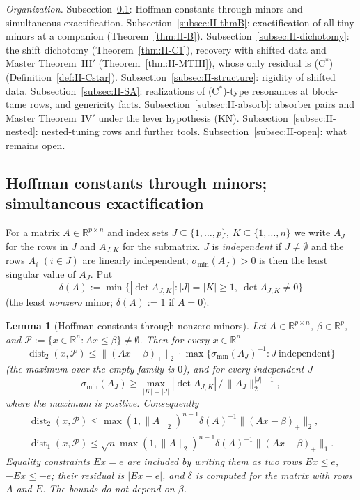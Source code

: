 \documentclass[10pt]{amsart}
\newtheorem{lemma}[theorem]{Lemma}
\theoremstyle{definition}
\theoremstyle{remark}
\newcommand{\dist}{\operatorname{dist}}
\newcommand{\R}{\mathbb R}
\begin{document}
\smallskip\noindent\emph{Organization.}
Subsection~\ref{subsec:II-hoffman}: Hoffman constants through minors and
simultaneous exactification.  Subsection~\ref{subsec:II-thmB}: exactification
of all tiny minors at a companion (Theorem~\ref{thm:II-B}).
Subsection~\ref{subsec:II-dichotomy}: the shift dichotomy
(Theorem~\ref{thm:II-C1}), recovery with shifted data and Master
Theorem~III$'$ (Theorem~\ref{thm:II-MTIII}), whose only residual is (C$^*$)
(Definition~\ref{def:II-Cstar}).  Subsection~\ref{subsec:II-structure}:
rigidity of shifted data.  Subsection~\ref{subsec:II-SA}: realizations of
(C$^*$)-type resonances at block-tame rows, and genericity facts.
Subsection~\ref{subsec:II-absorb}: absorber pairs and Master
Theorem~IV$'$ under the lever hypothesis (KN).
Subsection~\ref{subsec:II-nested}: nested-tuning rows and further tools.
Subsection~\ref{subsec:II-open}: what remains open.

\subsection{Hoffman constants through minors; simultaneous exactification}\label{subsec:II-hoffman}

For a matrix $A\in\R^{p\times n}$ and index sets $J\subseteq\{1,\dots,p\}$,
$K\subseteq\{1,\dots,n\}$ we write $A_J$ for the rows in $J$ and $A_{J,K}$
for the submatrix.  $J$ is \emph{independent} if $J\ne\emptyset$ and the
rows $A_i$ $(i\in J)$ are linearly independent; $\sigma_{\min}(A_J)>0$ is
then the least singular value of $A_J$.  Put
\[
 \delta(A):=\min\{|\det A_{J,K}|:|J|=|K|\ge1,\ \det A_{J,K}\ne0\}
\]
(the least \emph{nonzero} minor; $\delta(A):=1$ if $A=0$).

\begin{lemma}[Hoffman constants through nonzero minors]\label{lem:II-hoffman}
Let $A\in\R^{p\times n}$, $\beta\in\R^p$, and $\mathcal P:=\{x\in\R^n:Ax\le
\beta\}\ne\emptyset$.  Then for every $x\in\R^n$
\begin{equation}\label{eq:II-hoff1}
 \dist_2(x,\mathcal P)\le\|(Ax-\beta)_+\|_2\cdot\max\{\sigma_{\min}(A_J)^{-1}:
 J\ \text{independent}\}
\end{equation}
\textup{(}the maximum over the empty family is $0$\textup{)}, and for every
independent $J$
\begin{equation}\label{eq:II-hoff2}
 \sigma_{\min}(A_J)\ge\max_{|K|=|J|}|\det A_{J,K}|\,\big/\,\|A_J\|_2^{|J|-1},
\end{equation}
where the maximum is positive.  Consequently
\begin{equation}\label{eq:II-hoff3}
 \begin{gathered}
 \dist_2(x,\mathcal P)\le\max(1,\|A\|_2)^{n-1}\delta(A)^{-1}\|(Ax-\beta)_+\|_2,\\
 \dist_1(x,\mathcal P)\le\sqrt n\max(1,\|A\|_2)^{n-1}\delta(A)^{-1}
 \|(Ax-\beta)_+\|_1 .
 \end{gathered}
\end{equation}
Equality constraints $Ex=e$ are included by writing them as two rows
$Ex\le e$, $-Ex\le-e$; their residual is $|Ex-e|$, and $\delta$ is computed
for the matrix with rows $A$ and $E$.  The bounds do not depend on $\beta$.
\end{lemma}
\end{document}
